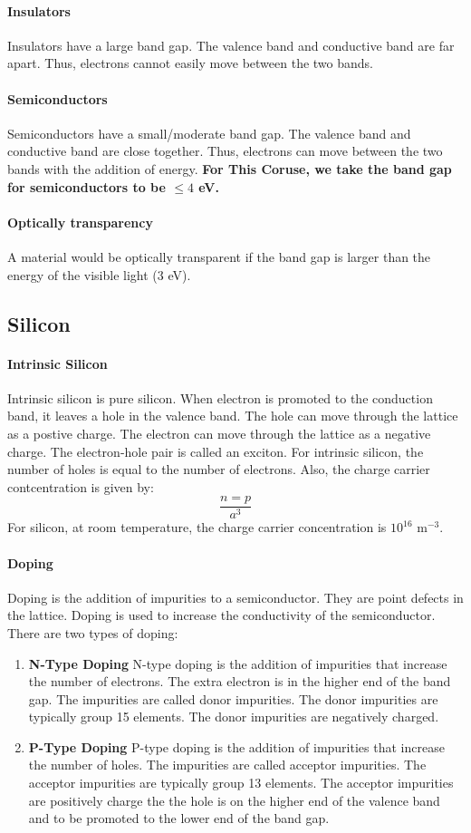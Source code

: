 \documentclass[11pt]{article}
\begin{document}
\paragraph{Insulators} Insulators have a large band gap. The valence band and conductive band are far apart. Thus, electrons cannot easily move between the two bands.
\paragraph{Semiconductors} Semiconductors have a small/moderate band gap. The valence band and conductive band are close together. Thus, electrons can move between the two bands with the addition of energy.
\textbf{For This Coruse, we take the band gap for semiconductors to be $\le 4$ eV.}
\paragraph{Optically transparency} A material would be optically transparent if the band gap is larger than the energy of the visible light (3 eV).
\subsection{Silicon}
\paragraph{Intrinsic Silicon} Intrinsic silicon is pure silicon. When electron is promoted to the conduction band, it leaves a hole in the valence band. The hole can move through the lattice as a postive charge. The electron can move through the lattice as a negative charge. The electron-hole pair is called an exciton. For intrinsic silicon, the number of holes is equal to the number of electrons. Also, the charge carrier contcentration is given by:
\begin{equation}
    \frac{n=p}{a^3}
\end{equation}
For silicon, at room temperature, the charge carrier concentration is $10^{16}$ m$^{-3}$.
\paragraph{Doping} Doping is the addition of impurities to a semiconductor. They are point defects in the lattice. Doping is used to increase the conductivity of the semiconductor. There are two types of doping:
\begin{enumerate}
    \item \textbf{N-Type Doping} N-type doping is the addition of impurities that increase the number of electrons. The extra electron is in the higher end of the band gap. The impurities are called donor impurities. The donor impurities are typically group 15 elements. The donor impurities are negatively charged.
    \item \textbf{P-Type Doping} P-type doping is the addition of impurities that increase the number of holes. The impurities are called acceptor impurities. The acceptor impurities are typically group 13 elements. The acceptor impurities are positively charge the the hole is on the higher end of the valence band and to be promoted to the lower end of the band gap.
\end{enumerate}
\end{document}
